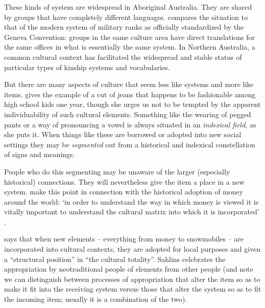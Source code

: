 These kinds of system are widespread in Aboriginal Australia. They are shared by 
groups that have completely different languages. \citet{evans_enigma_2012} compares the 
situation to that of the modern system of military ranks as officially 
standardized by the Geneva Convention: groups in the same culture area have direct translations for the same offices in what is essentially the same system. In Northern Australia, a common cultural context has 
facilitated the widespread and stable status of particular types of 
kinship systems and vocabularies. 



But there are many aspects of culture that seem less 
like systems and more like items. \citet{eckert_variation_2008} gives the example of a cut of 
jeans that happens to be fashionable among high school kids one year, though she urges us not to be tempted by the apparent individuability of 
such cultural elements. Something like the wearing of pegged pants or a 
way of pronouncing a vowel is always situated in an \textit{indexical 
field}, as she puts it. When things like these are borrowed or adopted into new 
social settings they may be \textit{segmented} out from a historical and 
indexical constellation of signs and meanings. 



People who do this segmenting may be unaware of the larger (especially 
historical) connections. They will nevertheless give the item a 
place in a new system. \citet{parry_money_1989} make this point in connection with the historical adoption of money around the world: \textquoteleft in 
order to understand the way in which money is viewed it is vitally 
important to understand the cultural matrix into which it is 
incorporated' \citep[1]{parry_money_1989}.



\citet{sahlins_what_1999} says that when new elements -- everything from 
money to snowmobiles -- are incorporated into cultural contexts, they are 
adopted for local purposes and given a ``structural position'' in ``the 
cultural totality''. Sahlins celebrates the appropriation 
by neotraditional people of elements from other people 
(and note we can distinguish between processes of appropriation that 
alter the item so as to make it fit into the receiving system versus 
those that alter the system so as to fit the incoming item; usually it is a combination of the two). 



